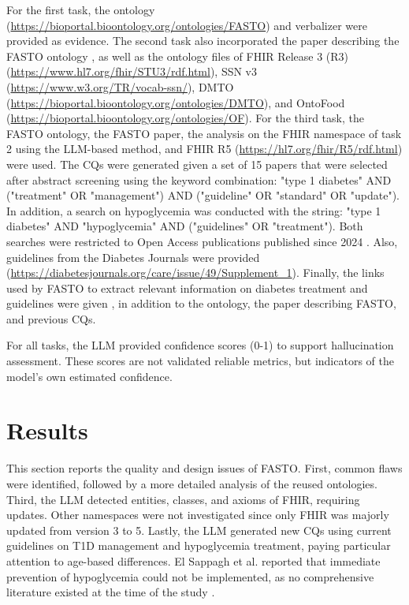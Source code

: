 \documentclass[
]{ceurart}
\begin{document}
For the first task, the ontology (\href{https://bioportal.bioontology.org/ontologies/FASTO}{https://bioportal.bioontology.org/ontologies/FASTO}) and verbalizer were provided as evidence. The second task also incorporated the paper describing the FASTO ontology \cite{ElSappagh2019_FASTO}, as well as the ontology files of FHIR Release 3 (R3) (\href{https://www.hl7.org/fhir/STU3/rdf.html}{https://www.hl7.org/fhir/STU3/rdf.html}), SSN v3 (\href{https://www.w3.org/TR/vocab-ssn/}{https://www.w3.org/TR/vocab-ssn/}), DMTO (\href{https://bioportal.bioontology.org/ontologies/DMTO}{https://bioportal.bioontology.org/ontologies/DMTO}), and OntoFood (\href{https://bioportal.bioontology.org/ontologies/OF}{https://bioportal.bioontology.org/ontologies/OF}). For the third task, the FASTO ontology, the FASTO paper, the analysis on the FHIR namespace of task 2 using the LLM-based method, and FHIR R5 (\href{https://hl7.org/fhir/R5/rdf.html} {https://hl7.org/fhir/R5/rdf.html}) were used. The CQs were generated given a set of 15 papers \cite{obesity2025, diabTech2025, preventionDelay2025, children2025, revision2025, olderadults2025, glycemicGoals2025, imporvingcare2025} that were selected after abstract screening using the keyword combination: "type 1 diabetes" AND ("treatment" OR "management") AND ("guideline" OR "standard" OR "update"). In addition, a search on hypoglycemia was conducted with the string: "type 1 diabetes" AND "hypoglycemia" AND ("guidelines" OR "treatment"). Both searches were restricted to Open Access publications published since 2024 \cite{glycemic2024, Sherr2026, Talbo2026, Singh2024, Lundemose2025, Zeng2025}. Also, guidelines from the Diabetes Journals were provided (\href{https://diabetesjournals.org/care/issue/49/Supplement_1}{https://diabetesjournals.org/care/issue/49/Supplement\_1}). Finally, the links used by FASTO to extract relevant information on diabetes treatment and guidelines were given \cite{ElSappagh2019_FASTO}, in addition to the ontology, the paper describing FASTO, and previous CQs. 

For all tasks, the LLM provided confidence scores (0-1) to support hallucination assessment. These scores are not validated reliable metrics, but indicators of the model's own estimated confidence. 


\section{Results}
\label{sec:results}

This section reports the quality and design issues of FASTO. First, common flaws were identified, followed by a more detailed analysis of the reused ontologies. Third, the LLM detected entities, classes, and axioms of FHIR, requiring updates. Other namespaces were not investigated since only FHIR was majorly updated from version 3 to 5. Lastly, the LLM generated new CQs using current guidelines on T1D management and hypoglycemia treatment, paying particular attention to age-based differences. El Sappagh et al. reported that immediate prevention of hypoglycemia could not be implemented, as no comprehensive literature existed at the time of the study \cite{ElSappagh2019_FASTO}. 
\end{document}
